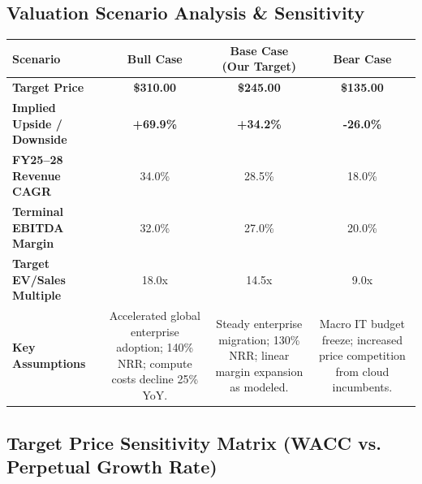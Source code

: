 \documentclass[10pt,a4paper]{scrartcl}
\begin{document}
\newpage

\textcolor{NavyPrimary}{\section*{Valuation Scenario Analysis \& Sensitivity}}

\begin{tcolorbox}[calloutbox, title=\textcolor{NavyPrimary}{Bull / Base / Bear Case Breakdown}, colframe=NavyPrimary, colbacktitle=NavyPrimary, coltitle=white]
    \small
    \setlength{\tabcolsep}{4pt}
    \begin{tabularx}{\textwidth}{@{} L C C C @{}}
        \toprule
        \textbf{Scenario} & \textbf{Bull Case} & \textbf{Base Case (Our Target)} & \textbf{Bear Case} \\
        \midrule
        \textbf{Target Price} & \textbf{\$310.00} & \textbf{\$245.00} & \textbf{\$135.00} \\
        \textbf{Implied Upside / Downside} & \textcolor{BuyGreen}{\textbf{+69.9\%}} & \textcolor{BuyGreen}{\textbf{+34.2\%}} & \textcolor{BearRed}{\textbf{-26.0\%}} \\
        \midrule
        \textbf{FY25--28 Revenue CAGR} & 34.0\% & 28.5\% & 18.0\% \\
        \textbf{Terminal EBITDA Margin} & 32.0\% & 27.0\% & 20.0\% \\
        \textbf{Target EV/Sales Multiple} & 18.0x & 14.5x & 9.0x \\
        \midrule
        \textbf{Key Assumptions} & Accelerated global enterprise adoption; 140\% NRR; compute costs decline 25\% YoY. & Steady enterprise migration; 130\% NRR; linear margin expansion as modeled. & Macro IT budget freeze; increased price competition from cloud incumbents. \\
        \bottomrule
    \end{tabularx}
\end{tcolorbox}

\vspace{8pt}

\textcolor{NavyPrimary}{\subsection*{Target Price Sensitivity Matrix (WACC vs. Perpetual Growth Rate)}}
\end{document}
